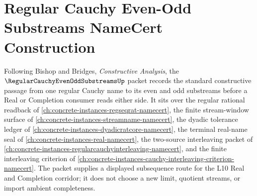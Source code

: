 \chapter{Regular Cauchy Even-Odd Substreams NameCert Construction}
\label{ch:concrete-instances-regular-cauchy-even-odd-substreams-namecert}

Following Bishop and Bridges, \emph{Constructive Analysis}, the $\RegularCauchyEvenOddSubstreamsUp$ packet records the standard constructive passage from one regular Cauchy name to its even and odd substreams before a Real or Completion consumer reads either side. It sits over the regular rational readback of \autoref{ch:concrete-instances-regseqrat-namecert}, the finite stream-window surface of \autoref{ch:concrete-instances-streamname-namecert}, the dyadic tolerance ledger of \autoref{ch:concrete-instances-dyadicratcore-namecert}, the terminal real-name seal of \autoref{ch:concrete-instances-real-namecert}, the two-source interleaving packet of \autoref{ch:concrete-instances-regularcauchyinterleaving-namecert}, and the finite interleaving criterion of \autoref{ch:concrete-instances-cauchy-interleaving-criterion-namecert}. The packet supplies a displayed subsequence route for the L10 Real and Completion corridor; it does not choose a new limit, quotient streams, or import ambient completeness.

